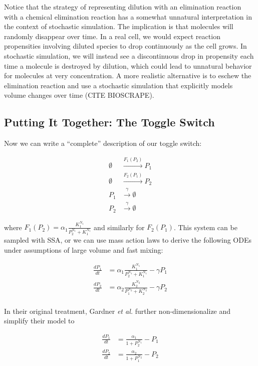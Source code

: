 \documentclass[preprint,12pt]{elsarticle}
\begin{document}
Notice that the strategy of representing dilution with an elimination reaction with a chemical elimination reaction has a somewhat unnatural interpretation in the context of stochastic simulation. The implication is that molecules will randomly disappear over time. In a real cell, we would expect reaction propensities involving diluted species to drop continuously as the cell grows. In stochastic simulation, we will instead see a discontinuous drop in propensity each time a molecule is destroyed by dilution, which could lead to unnatural behavior for molecules at very concentration. A more realistic alternative is to eschew the elimination reaction and use a stochastic simulation that explicitly models volume changes over time (CITE BIOSCRAPE).

\subsection{Putting It Together: The Toggle Switch}

Now we can write a ``complete'' description of our toggle switch:

\begin{align}
	\emptyset &\xrightarrow{F_1(P_2)} P_1\\
	\emptyset &\xrightarrow{F_2(P_1)} P_2\\
	P_1 &\xrightarrow{\gamma} \emptyset\\
	P_2 &\xrightarrow{\gamma} \emptyset	
\end{align}

where $F_1(P_2) = \alpha_1\frac{K_1^{N_1}}{P_2^{N_1} + K_1^{N_1}}$ and similarly for $F_2(P_1)$. This system can be sampled with SSA, or we can use mass action laws to derive the following ODEs under assumptions of large volume and fast mixing:

\begin{align}
	\frac{dP_1}{dt} &= \alpha_1\frac{K_1^{N_1}}{P_2^{N_1} + K_1^{N_1}} - \gamma P_1\\
	\frac{dP_2}{dt} &= \alpha_2\frac{K_2^{N_2}}{P_1^{N_2} + K_2^{N_2}} - \gamma P_2\\
\end{align}

In their original treatment, Gardner \emph{et al.} further non-dimensionalize and simplify their model to 

\begin{align}
	\frac{dP_1}{dt} &= \frac{\alpha_1}{1 + P_2^{N_1}} - P_1\\
	\frac{dP_2}{dt} &= \frac{\alpha_2}{1 + P_1^{N_2}} - P_2\\	
\end{align}
\end{document}
